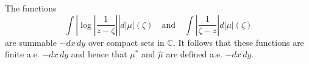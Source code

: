 
The functions
$$\int \left| \log \left| \frac{1}{z - \zeta} \right| \right| d|\mu|(\zeta) \quad \text{and} \quad \int \left| \frac{1}{\zeta - z} \right| d|\mu|(\zeta)$$
are summable $-dx\,dy$ over compact sets in $\mathbb{C}$. It follows that these functions are finite a.e. $-dx\,dy$ and hence that $\mu^*$ and $\hat{\mu}$ are defined a.e. $-dx\,dy$.
